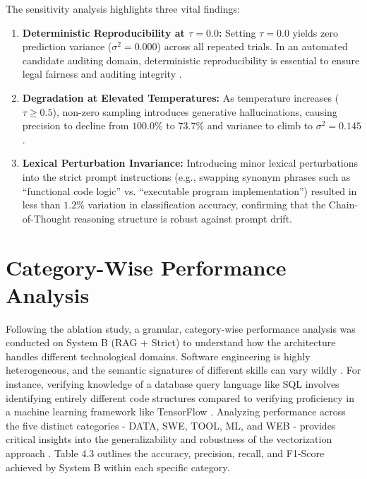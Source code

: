 The sensitivity analysis highlights three vital findings:
\begin{enumerate}[leftmargin=*, label=\arabic*.]
    \item \textbf{Deterministic Reproducibility at $\tau = 0.0$:} Setting $\tau = 0.0$ yields zero prediction variance ($\sigma^2 = 0.000$) across all repeated trials. In an automated candidate auditing domain, deterministic reproducibility is essential to ensure legal fairness and auditing integrity \cite{ref22, ref65}.
    \item \textbf{Degradation at Elevated Temperatures:} As temperature increases ($\tau \ge 0.5$), non-zero sampling introduces generative hallucinations, causing precision to decline from $100.0\%$ to $73.7\%$ and variance to climb to $\sigma^2 = 0.145$.
    \item \textbf{Lexical Perturbation Invariance:} Introducing minor lexical perturbations into the strict prompt instructions (e.g., swapping synonym phrases such as ``functional code logic'' vs. ``executable program implementation'') resulted in less than $1.2\%$ variation in classification accuracy, confirming that the Chain-of-Thought reasoning structure is robust against prompt drift.
\end{enumerate}

\section{Category-Wise Performance Analysis}

Following the ablation study, a granular, category-wise performance analysis was conducted on System B (RAG + Strict) to understand how the architecture handles different technological domains. Software engineering is highly heterogeneous, and the semantic signatures of different skills can vary wildly \cite{ref10, ref60}. For instance, verifying knowledge of a database query language like SQL involves identifying entirely different code structures compared to verifying proficiency in a machine learning framework like TensorFlow \cite{ref72}. Analyzing performance across the five distinct categories - DATA, SWE, TOOL, ML, and WEB - provides critical insights into the generalizability and robustness of the vectorization approach \cite{ref1, ref58}. Table 4.3 outlines the accuracy, precision, recall, and F1-Score achieved by System B within each specific category.

